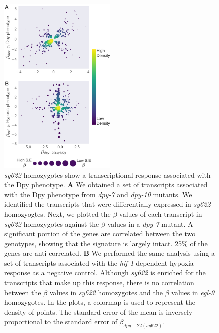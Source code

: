 \documentclass[10pt, twocolumn]{article}
\newcommand{\gene}[1]{\mbox{\emph{#1}}}
\newcommand{\dpy}{\gene{dpy-22} (\emph{MED-12})}
\begin{document}
\begin{figure}
  \centering{}
  \includegraphics[width=0.5\textwidth]{../figs/dpy_phenotype.pdf}
  \caption{
    \emph{sy622} homozygotes show a transcriptional response associated with the
    Dpy phenotype.
    \textbf{A} We obtained a set of transcripts associated with the Dpy phenotype
    from \gene{dpy-7} and \gene{dpy-10} mutants. We identified the transcripts
    that were differentially expressed in \emph{sy622} homozyogtes. Next,
    we plotted the $\beta$ values of each transcript in \emph{sy622} homozygotes
    against the $\beta$ values in a \emph{dpy-7} mutant. A significant portion
    of the genes are correlated between the two genotypes, showing that the
    signature is largely intact. 25\% of the genes are anti-correlated.
    \textbf{B} We performed the same analysis using a set of transcripts associated
    with the \gene{hif-1}-dependent hypoxia response as a negative control.
    Although \emph{sy622} is enriched for the transcripts that make up this
    response, there is no correlation between the $\beta$ values in \emph{sy622}
    homozygotes and the  $\beta$ values in \emph{egl-9} homozygotes.
    In the plots, a colormap is used to represent the density of points. The
    standard error of the mean is inversely proportional to the standard error
    of $\beta_{dpy-22(sy622)}$.
    }
\label{fig:dpy_phenotype}
\end{figure}


\end{document}
